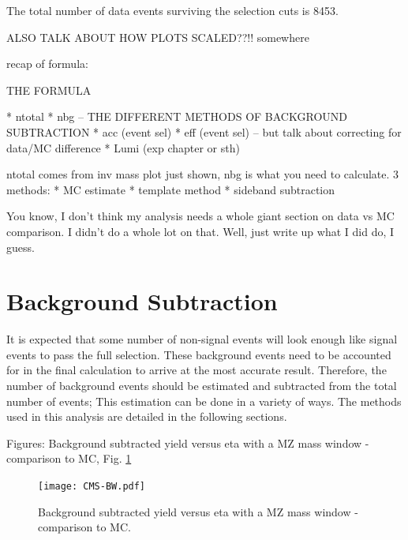 The total number of data events surviving 
the selection cuts is 8453.  

ALSO TALK ABOUT HOW PLOTS SCALED??!!  somewhere


recap of formula:

THE FORMULA

   * ntotal
   * nbg -- THE DIFFERENT METHODS OF BACKGROUND SUBTRACTION
   * acc (event sel)
   * eff (event sel) -- but talk about correcting for data/MC difference
   * Lumi (exp chapter or sth)

ntotal comes from inv mass plot just shown, nbg is what you need to calculate.
3 methods: 
   * MC estimate
   * template method
   * sideband subtraction

You know, I don't think my analysis needs a whole giant section on data vs MC comparison.  
I didn't do a whole lot on that.  
Well, just write up what I did do, I guess.  

\section{Background Subtraction}
\label{anMeth:BGSub}
It is expected that some number of non-signal events %
will look enough like signal events to pass the full selection.  
These background events need to be accounted for 
in the final calculation to arrive 
at the most accurate result.  
Therefore, the number of background events should 
be estimated and subtracted from the total number 
of events; 
This estimation can be done in a variety of ways.  
The methods used in this analysis are detailed 
in the following sections.  

Figures: Background subtracted yield versus eta with a MZ mass window - comparison to MC, Fig. \ref{fig:YieldVsZEtaComparedToMC}

 \begin{figure}[htb]
  \begin{center}
    \texttt{[image: CMS-BW.pdf]}
  \end{center}
  \caption[Background subtracted yield versus eta with a MZ mass window - comparison to MC]{Background subtracted yield versus eta with a MZ mass window - comparison to MC.}
  \label{fig:YieldVsZEtaComparedToMC}
 \end{figure}

